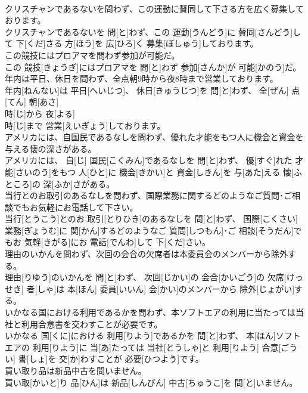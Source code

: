 \documentclass[8pt]{extreport}
\begin{document}
\begin{CJK}{UTF8}{min}
\\	クリスチャンであるないを問わず、この運動に賛同して下さる方を広く募集しております。	
\\	クリスチャンであるないを 問[と]わず、この 運動[うんどう]に 賛同[さんどう]して 下[くだ]さる 方[ほう]を 広[ひろ]く 募集[ぼしゅう]しております。
\\	この競技にはプロアマを問わず参加が可能だ。	
\\	この 競技[きょうぎ]にはプロアマを 問[と]わず 参加[さんか]が 可能[かのう]だ。
\\	年内は平日、休日を問わず、全点朝9時から夜8時まで営業しております。	
\\	年内[ねんない]は 平日[へいじつ]、 休日[きゅうじつ]を 問[と]わず、 全[ぜん] 点[てん] 朝[あさ] 
\\	時[じ]から 夜[よる] 
\\	時[じ]まで 営業[えいぎょう]しております。
\\	アメリカには、自国民であるなしを問わず、優れた才能をもつ人に機会と資金を与える懐の深さがある。	
\\	アメリカには、 自[じ] 国民[こくみん]であるなしを 問[と]わず、 優[すぐ]れた 才能[さいのう]をもつ 人[ひと]に 機会[きかい]と 資金[しきん]を 与[あた]える 懐[ふところ]の 深[ふか]さがある。
\\	当行とのお取引のあるなしを問わず、国際業務に関するどのようなご質問･ご相談でもお気軽にお電話して下さい。	
\\	当行[とうこう]とのお 取引[とりひき]のあるなしを 問[と]わず、 国際[こくさい] 業務[ぎょうむ]に 関[かん]するどのようなご 質問[しつもん]･ご 相談[そうだん]でもお 気軽[きがる]にお 電話[でんわ]して 下[くだ]さい。
\\	理由のいかんを問わず、次回の会合の欠席者は本委員会のメンバーから除外する。	
\\	理由[りゆう]のいかんを 問[と]わず、 次回[じかい]の 会合[かいごう]の 欠席[けっせき] 者[しゃ]は 本[ほん] 委員[いいん] 会[かい]のメンバーから 除外[じょがい]する。
\\	いかなる国における利用であるかを問わず、本ソフトエアの利用に当たっては当社と利用合意書を交わすことが必要です。	
\\	いかなる 国[くに]における 利用[りよう]であるかを 問[と]わず、 本[ほん]ソフトエアの 利用[りよう]に 当[あ]たっては 当社[とうしゃ]と 利用[りよう] 合意[ごうい] 書[しょ]を 交[か]わすことが 必要[ひつよう]です。
\\	買い取り品は新品中古を問いません。	
\\	買い取[かいと]り 品[ひん]は 新品[しんぴん] 中古[ちゅうこ]を 問[と]いません。

\end{CJK}
\end{document}
